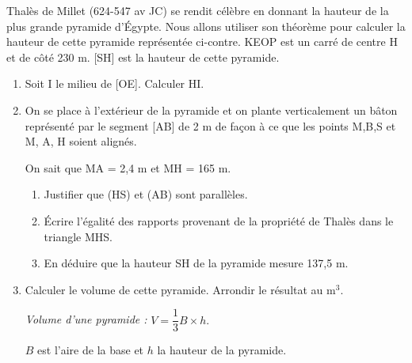 \documentclass[exercice]{thedocument}%
\begin{document}
%
\begin{minipage}[t]{.49\linewidth}
    Thalès de Millet (624-547 av JC) se rendit célèbre en donnant la hauteur de la
    plus grande pyramide d'Égypte. Nous allons utiliser son théorème pour calculer
    la hauteur de cette pyramide représentée ci-contre. KEOP est un carré de centre
    H et de côté 230 m. [SH] est la hauteur de cette pyramide.
\end{minipage}%
\begin{minipage}[t]{.49\linewidth}
\end{minipage}
\begin{enumerate}
    \item Soit I le milieu de [OE]. Calculer HI.
    \item On se place à l'extérieur de la pyramide et on plante verticalement
    un bâton représenté par le segment [AB] de 2 m de façon à ce que les points
    M,B,S et M, A, H soient alignés.\par\noindent On sait que MA = 2,4 m et    
    MH = 165 m.
    \begin{enumerate}
        \item Justifier que (HS) et (AB) sont parallèles.
        \item Écrire l'égalité des rapports provenant de la propriété de Thalès
        dans le triangle MHS.
        \item En déduire que la hauteur SH de la pyramide mesure 137,5 m.
    \end{enumerate}
    \item Calculer le volume de cette pyramide. Arrondir le résultat au m$^3$.\par\noindent
    \textit{Volume d'une pyramide :} $V=\dfrac13B\times h.$\par\noindent
    $B$ est l'aire de la base et $h$ la hauteur de la pyramide.
\end{enumerate}
\end{document}
